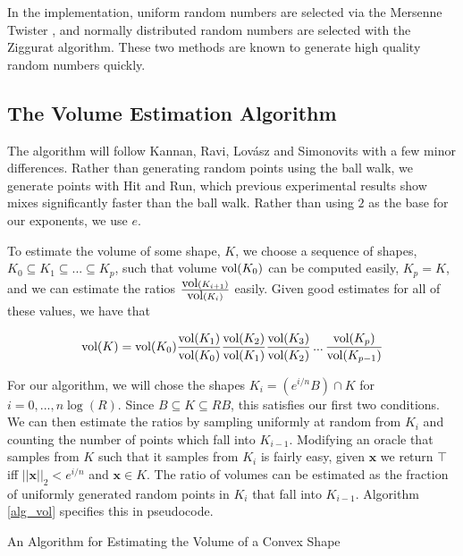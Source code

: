 In the implementation, uniform random numbers are selected via the Mersenne Twister \cite{Matsumoto98}, and normally distributed random numbers are selected with the Ziggurat algorithm\cite{Marsaglia00, Burkardt07}. These two methods are known to generate high quality random numbers quickly.

\subsection{The Volume Estimation Algorithm}

The algorithm will follow Kannan, Ravi, Lov\'{a}sz and Simonovits \cite{Kannan97} with a few minor differences. Rather than generating random points using the ball walk, we generate points with Hit and Run, which previous experimental results show mixes significantly faster than the ball walk. Rather than using $2$ as the base for our exponents, we use $e$.

To estimate the volume of some shape, $K$, we choose a sequence of shapes, $K_0 \subseteq K_1 \subseteq ... \subseteq K_p$, such that volume $\mbox{vol} (K_0)$ can be computed easily, $K_p = K$, and we can estimate the ratios $\frac{\mbox{vol}(K_{i+1})}{\mbox{vol}(K_i)}$ easily. Given good estimates for all of these values, we have that

$$
\mbox{vol}(K) = \mbox{vol}(K_0) \frac{\mbox{vol}(K_1)}{\mbox{vol}(K_0)} \frac{\mbox{vol}(K_2)}{\mbox{vol}(K_1)} \frac{\mbox{vol}(K_3)}{\mbox{vol}(K_2)} \, ... \, \frac{\mbox{vol}(K_p)}{\mbox{vol}(K_{p-1})}
$$

For our algorithm, we will chose the shapes $K_i = (e^{i/n}B) \cap K$ for $i = 0, ..., n \log (R)$. Since $B \subseteq K \subseteq RB$, this satisfies our first two conditions. We can then estimate the ratios by sampling uniformly at random from $K_i$ and counting the number of points which fall into $K_{i-1}$. Modifying an oracle that samples from $K$ such that it samples from $K_i$ is fairly easy, given ${\bm x}$ we return $\top$ iff $||{\bm x}||_2 < e^{i/n}$ and ${\bm x} \in K$. The ratio of volumes can be estimated as the fraction of uniformly generated random points in $K_i$ that fall into $K_{i-1}$. Algorithm \ref{alg_vol} specifies this in pseudocode.

\begin{algorithm}
\SetAlgoLined
{}

\caption{An Algorithm for Estimating the Volume of a Convex Shape}\label{alg_vol}

\end{algorithm}

